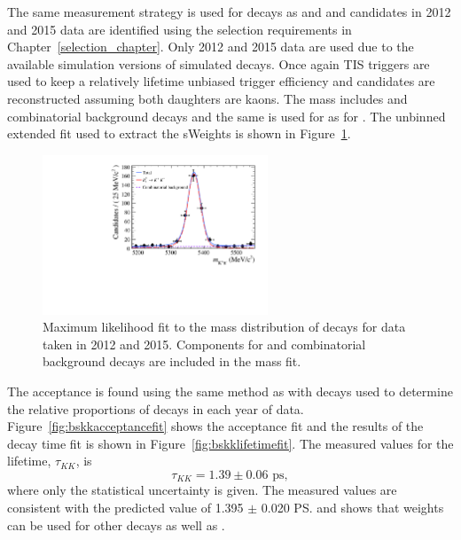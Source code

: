 
The same measurement strategy is used for \bskk decays as \bsmumu and \bdkpi and candidates in 2012 and 2015 data are identified using the selection requirements in Chapter~\ref{selection_chapter}. Only 2012 and 2015 data are used due to the available simulation versions of simulated \bskk decays. Once again TIS triggers are used to keep a relatively lifetime unbiased trigger efficiency and candidates are reconstructed assuming both daughters are kaons. The mass \pdf includes \bskk and combinatorial background decays and the same \pdf is used for \bskk as for \bskpi. The unbinned extended \ml fit used to extract the sWeights is shown in Figure~\ref{fig:bskkmassfit}. 

\begin{figure}[tbp]
\centering
  \includegraphics[width=0.6\textwidth]{./Figs/LifetimeSystematics/Bs2KK_mass_fit.pdf}
\caption{Maximum likelihood fit to the mass distribution of \bskk decays for data taken in 2012 and 2015. Components for \bskk and combinatorial background decays are included in the mass fit. }
\label{fig:bskkmassfit}
\end{figure}


The \bskk acceptance is found using the same method as \bsmumu with \bsjpsiphi decays used to determine the relative proportions of decays in each year of data. Figure~\ref{fig:bskkacceptancefit} shows the acceptance fit and the results of the decay time fit is shown in Figure~\ref{fig:bskklifetimefit}. The measured values for the lifetime, $\tau_{KK}$, is
\begin{equation}
\tau_{KK} = 1.39 \pm 0.06  \text{ ps}, 
\end{equation}
where only the statistical uncertainty is given.%
The measured values are consistent with the predicted value of 1.395 $\pm$ 0.020 \ps \cite{Aaij:2014fia} and shows that \bdkpi weights can be used for other decays as well as \bdkpi. 


